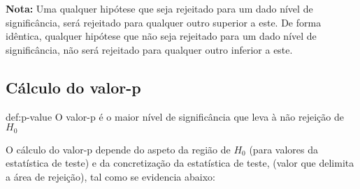 \noindent \textbf{Nota:} Uma qualquer hipótese que seja rejeitado para um dado nível de significância, será rejeitado para qualquer outro superior a este. De forma idêntica, qualquer hipótese que não seja rejeitado para um dado nível de significância, não será rejeitado para qualquer outro inferior a este.
\newpage
\subsection[6.1 Cálculo do valor-p]{\hspace*{0.075 em}\raisebox{0.2 em}{$\pmb{\drsh}$} Cálculo do valor-p}

\begin{theo}{def:p-value}\label{def:p-vlue}
    \noindent O valor-p é o maior nível de significância que leva à não rejeição de $H_0$
\end{theo}

\noindent O cálculo do valor-p depende do aspeto da região de $H_0$ (para valores da estatística de teste) e da concretização da estatística de teste, (valor que delimita a área de rejeição), tal como se evidencia abaixo:

